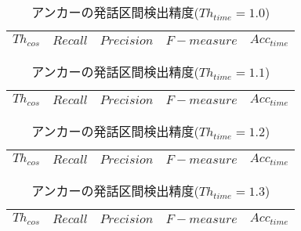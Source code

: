 \begin{table}[H]
  \begin{center}
    \caption{アンカーの発話区間検出精度($Th_{time}=1.0$) \label{table:result_get_anchor10}}
    \begin{tabular}{|c||c|c|c|c|} \hline
      $Th_{cos}$ & $Recall$ & $Precision$ & $F-measure$ & $Acc_{time}$\\ \hline


    \end{tabular}
  \end{center}
\end{table}

\begin{table}[H]
  \begin{center}
    \caption{アンカーの発話区間検出精度($Th_{time}=1.1$) \label{table:result_get_anchor11}}
    \begin{tabular}{|c||c|c|c|c|} \hline
      $Th_{cos}$ & $Recall$ & $Precision$ & $F-measure$ & $Acc_{time}$\\ \hline


    \end{tabular}
  \end{center}
\end{table}


\begin{table}[H]
  \begin{center}
    \caption{アンカーの発話区間検出精度($Th_{time}=1.2$) \label{table:result_get_anchor12}}
    \begin{tabular}{|c||c|c|c|c|} \hline
      $Th_{cos}$ & $Recall$ & $Precision$ & $F-measure$ & $Acc_{time}$\\ \hline


    \end{tabular}
  \end{center}
\end{table}

\begin{table}[H]
  \begin{center}
    \caption{アンカーの発話区間検出精度($Th_{time}=1.3$) \label{table:result_get_anchor13}}
    \begin{tabular}{|c||c|c|c|c|} \hline
      $Th_{cos}$ & $Recall$ & $Precision$ & $F-measure$ & $Acc_{time}$\\ \hline


    \end{tabular}
  \end{center}
\end{table}

